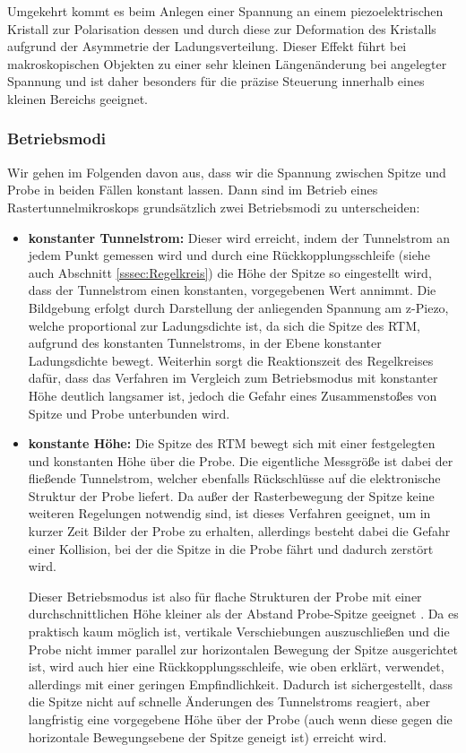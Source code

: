 \documentclass[10pt, a4paper]{article}
\begin{document}
Umgekehrt kommt es beim Anlegen einer Spannung an einem piezoelektrischen Kristall zur Polarisation dessen und durch diese zur Deformation des Kristalls aufgrund der Asymmetrie der Ladungsverteilung.
Dieser Effekt führt bei makroskopischen Objekten zu einer sehr kleinen Längenänderung bei angelegter Spannung und ist daher besonders für die präzise Steuerung innerhalb eines kleinen Bereichs geeignet.

\subsubsection{Betriebsmodi}
\label{sec:betriebsmodi}
Wir gehen im Folgenden davon aus, dass wir die Spannung zwischen Spitze und Probe in beiden Fällen konstant lassen.
Dann sind im Betrieb eines Rastertunnelmikroskops grundsätzlich zwei Betriebsmodi zu unterscheiden:
\begin{itemize}
  \item \textbf{konstanter Tunnelstrom:} Dieser wird erreicht, indem der Tunnelstrom an jedem Punkt gemessen wird und durch eine Rückkopplungsschleife (siehe auch Abschnitt \ref{sssec:Regelkreis}) die Höhe der Spitze so eingestellt wird, dass der Tunnelstrom einen konstanten, vorgegebenen Wert annimmt.
Die Bildgebung erfolgt durch Darstellung der anliegenden Spannung am z-Piezo, welche proportional zur Ladungsdichte ist, da sich die Spitze des RTM, aufgrund des konstanten Tunnelstroms, in der Ebene konstanter Ladungsdichte bewegt.
Weiterhin sorgt die Reaktionszeit des Regelkreises dafür, dass das Verfahren im Vergleich zum Betriebsmodus mit konstanter Höhe deutlich langsamer ist, jedoch die Gefahr eines Zusammenstoßes von Spitze und Probe unterbunden wird.

  \item \textbf{konstante Höhe:} Die Spitze des RTM bewegt sich mit einer festgelegten und konstanten Höhe über die Probe.
Die eigentliche Messgröße ist dabei der fließende Tunnelstrom, welcher ebenfalls Rückschlüsse auf die elektronische Struktur der Probe liefert.
Da außer der Rasterbewegung der Spitze keine weiteren Regelungen notwendig sind, ist dieses Verfahren geeignet, um in kurzer Zeit Bilder der Probe zu erhalten, allerdings besteht dabei die Gefahr einer Kollision, bei der die Spitze in die Probe fährt und dadurch zerstört wird.

Dieser Betriebsmodus ist also für flache Strukturen der Probe mit einer durchschnittlichen Höhe kleiner als der Abstand Probe-Spitze geeignet \cite{colton}.
Da es praktisch kaum möglich ist, vertikale Verschiebungen auszuschließen und die Probe nicht immer parallel zur horizontalen Bewegung der Spitze ausgerichtet ist, wird auch hier eine Rück\-kopp\-lungs\-schlei\-fe, wie oben erklärt, verwendet, allerdings mit einer geringen Empfindlichkeit. Dadurch ist sichergestellt, dass die Spitze nicht auf schnelle Änderungen des Tunnelstroms reagiert, aber langfristig eine vorgegebene Höhe über der Probe (auch wenn diese gegen die horizontale Bewegungsebene der Spitze geneigt ist) erreicht wird.
\end{itemize}
\end{document}
